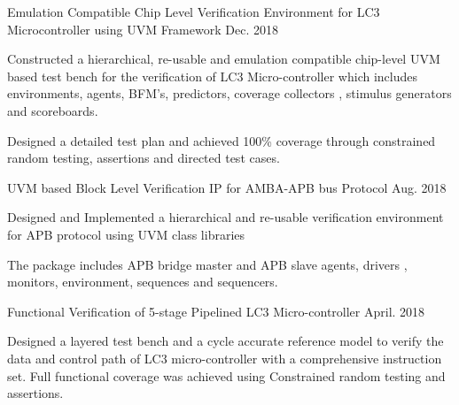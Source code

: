 \par\addvspace{1ex}
\begin{flushleft}
  \par\addvspace{-1.5mm}
  \fontsize{10.4pt}{1em}\selectfont{}
\end{flushleft}
\par\addvspace{-0.5ex}
\begin{cvprojects}
  \cvproject
    {Emulation Compatible Chip Level Verification Environment for LC3 Microcontroller using UVM Framework }
    {\color{darkgray}Dec. 2018}
    {
      \begin{cvprojectitems}
        \item {Constructed a hierarchical, re-usable and emulation compatible chip-level UVM based test bench for the verification of LC3 Micro-controller  which includes environments, agents, BFM's, predictors, coverage collectors , stimulus generators and scoreboards.}
        \item {Designed a detailed test plan and achieved 100\% coverage through constrained random testing, assertions and directed test cases.}
      \end{cvprojectitems}
    }

  \cvproject
    {UVM based Block Level Verification IP for AMBA-APB bus Protocol} 
    {\color{darkgray}Aug. 2018}
    {
      \begin{cvprojectitems}
        \item {Designed and Implemented a hierarchical and re-usable verification environment for APB protocol using UVM class libraries}
        \item {The package includes APB bridge master and APB slave agents, drivers , monitors, environment, sequences and sequencers. }
      \end{cvprojectitems}
    }

    \cvproject
    {Functional Verification of 5-stage Pipelined LC3 Micro-controller} 
    {\color{darkgray}April. 2018}
    {
      \begin{cvprojectitems}
        \item {Designed a layered test bench and a cycle accurate reference model to verify the data and control path of LC3 micro-controller with a comprehensive instruction set. Full functional coverage was achieved using Constrained random testing and assertions.}
      \end{cvprojectitems}
    }


\end{cvprojects}

